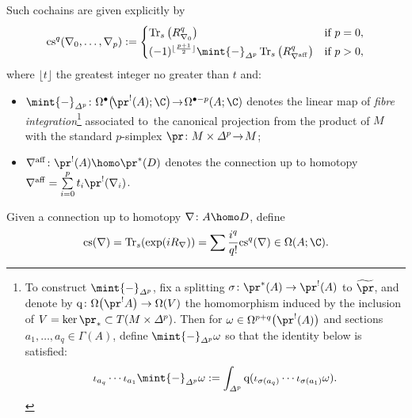 Such cochains are given explicitly by
\begin{gather*}%
 \mathrm{cs}^q(\nabla_0,\dots ,\nabla_p) := \begin{cases}
 \operatorname{Tr}_s\big(R_{\nabla_0}^q\big) & \text{if} \ p=0,\vspace{1mm}\\
 (-1)^{\lfloor{\frac{p+1}{2}}\rfloor }\mint{-}_{\varDelta^p}\operatorname{Tr}_s\big(R_{\nabla^{\mathrm{aff}}}^q\big) & \text{if} \ p>0,
 \end{cases}
\end{gather*}where $\lfloor{t}\rfloor$ the greatest integer no greater than $t$ and:
\begin{itemize}\itemsep=0pt
 \item $\mint{-}_{\varDelta^p}\colon \Omega^{\bullet}\big(\!\pr^!(A);\C\big) \!\to\! \Omega^{\bullet-p}(A;\C)$ denotes the linear map of \emph{fibre integration}\footnote{To construct $\mint{-}_{\varDelta^p}$, fix a splitting $\sigma\colon \pr^*(A) \to \pr^!(A)$ to $\widetilde{\pr}$, and denote by $\mathrm{q}\colon \Omega\big(\pr^!A\big) \to \Omega(V)$ the homomorphism induced by the inclusion of $V=\ker \pr_* \subset T(M \times \varDelta^p)$. Then for $\omega \in \Omega^{p+q}\big(\pr^!(A)\big)$ and sections $a_1,\dots ,a_q \in \Gamma(A)$, define $\mint{-}_{\varDelta^p}\omega$ so that the identity below is satisfied:
 \begin{gather*}%
 \iota_{a_q}\cdots \iota_{a_1}\mint{-}_{\varDelta^p}\omega:= \int_{\varDelta^p}\mathrm{q}(\iota_{\sigma(a_q)}\cdots \iota_{\sigma(a_1)}\omega).
 \end{gather*}} associated to~the canonical projection from the product of $M$ with the standard $p$-simplex $\pr\colon M \times \varDelta^p \!\to\! M$;
 \item $\nabla^{\mathrm{aff}} \colon \pr^!(A) \homo \pr^*(D)$ denotes the connection up to homotopy $\nabla^{\mathrm{aff}} = \sum\limits_{i=0}^p t_i\pr^!(\nabla_i)$.
\end{itemize}

Given a connection up to homotopy $\nabla\colon A \homo D$, define
\begin{gather*}
 \mathrm{cs}(\nabla)=\operatorname{Tr}_s(\exp(iR_{\nabla})) = \sum \frac{i^q}{q!}\mathrm{cs}^q(\nabla) \in \Omega(A;\C).
\end{gather*}

